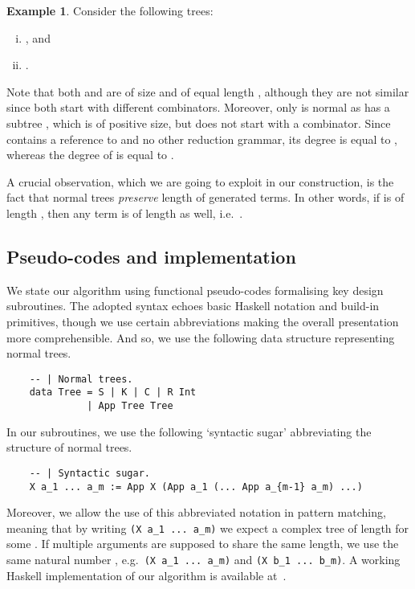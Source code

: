 \documentclass[11pt,a4paper]{amsart}
\theoremstyle{definition}
\newtheorem{example}[theorem]{Example}
\begin{document}
\begin{example}
        Consider the following trees:
        \begin{enumerate}[(i)]
                \item , and
            \item .
        \end{enumerate}
        Note that both  and  are of size  and of equal length
        , although they are not similar since both start with
        different combinators. Moreover, only  is normal as  has
        a subtree , which is of positive size, but does not start
        with a combinator. Since  contains a reference to  and no
        other reduction grammar, its degree is equal to , whereas the degree of
         is equal to .
\end{example}

A crucial observation, which we are going to exploit in our construction, is the fact that normal trees \emph{preserve} length of generated terms. In other words, if  is of length , then any term  is of length  as well, i.e.~.

\subsection{Pseudo-codes and implementation}\label{sec-pseudocodes}

We state our algorithm using functional pseudo-codes formalising key design subroutines. The adopted syntax echoes basic Haskell notation and build-in primitives, though we use certain abbreviations making the overall presentation more comprehensible. And so, we use the following data structure representing normal trees.

\begin{lstlisting}
    -- | Normal trees.
    data Tree = S | K | C | R Int
              | App Tree Tree
\end{lstlisting}
 
In our subroutines, we use the following `syntactic sugar' abbreviating the structure of normal trees.

\begin{lstlisting}
    -- | Syntactic sugar.
    X a_1 ... a_m := App X (App a_1 (... App a_{m-1} a_m) ...)
\end{lstlisting}

Moreover, we allow the use of this abbreviated notation in pattern matching, meaning that by writing \verb|(X a_1 ... a_m)| we expect a complex tree of length  for some . If multiple arguments are supposed to share the same length, we use the same natural number , e.g.~\verb|(X a_1 ... a_m)| and \verb|(X b_1 ... b_m)|.
A working Haskell implementation of our algorithm is available at~\cite{mb-haskell-implementation}.
\end{document}

